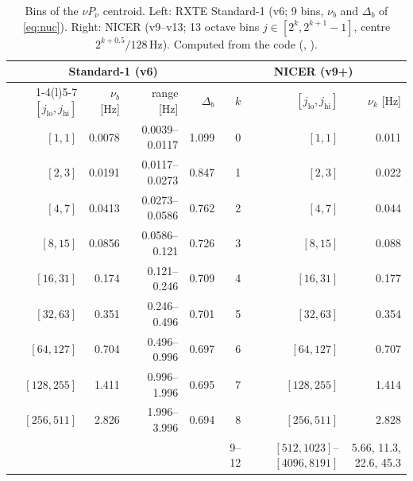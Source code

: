 \begin{table}[htbp]
\centering\small
\caption[Bins of the $\nu P_\nu$ centroid]{Bins of the $\nu P_\nu$ centroid. Left: RXTE Standard-1 (v6; 9 bins, $\nu_b$ and
$\Delta_b$ of \cref{eq:nuc}). Right: NICER (v9--v13; 13 octave bins $j\in[2^k,2^{k+1}-1]$, centre $2^{k+0.5}/128$\,Hz).
Computed from the code (, ).}
\label{tab:nucbins}
\begin{tabular}{@{}rrrr@{\hspace{18pt}}rrr@{}}
\toprule
\multicolumn{4}{c}{Standard-1 (v6)} & \multicolumn{3}{c}{NICER (v9+)}\\
\cmidrule(r){1-4}\cmidrule(l){5-7}
$[j_\mathrm{lo},j_\mathrm{hi}]$ & $\nu_b$ [Hz] & range [Hz] & $\Delta_b$ & $k$ & $[j_\mathrm{lo},j_\mathrm{hi}]$ & $\nu_k$ [Hz]\\
\midrule
$[1,1]$ & 0.0078 & 0.0039--0.0117 & 1.099 & 0 & $[1,1]$ & 0.011 \\
$[2,3]$ & 0.0191 & 0.0117--0.0273 & 0.847 & 1 & $[2,3]$ & 0.022 \\
$[4,7]$ & 0.0413 & 0.0273--0.0586 & 0.762 & 2 & $[4,7]$ & 0.044 \\
$[8,15]$ & 0.0856 & 0.0586--0.121 & 0.726 & 3 & $[8,15]$ & 0.088 \\
$[16,31]$ & 0.174 & 0.121--0.246 & 0.709 & 4 & $[16,31]$ & 0.177 \\
$[32,63]$ & 0.351 & 0.246--0.496 & 0.701 & 5 & $[32,63]$ & 0.354 \\
$[64,127]$ & 0.704 & 0.496--0.996 & 0.697 & 6 & $[64,127]$ & 0.707 \\
$[128,255]$ & 1.411 & 0.996--1.996 & 0.695 & 7 & $[128,255]$ & 1.414 \\
$[256,511]$ & 2.826 & 1.996--3.996 & 0.694 & 8 & $[256,511]$ & 2.828 \\
 & & & & 9--12 & $[512,1023]$--$[4096,8191]$ & 5.66, 11.3, 22.6, 45.3 \\
\bottomrule
\end{tabular}
\end{table}

